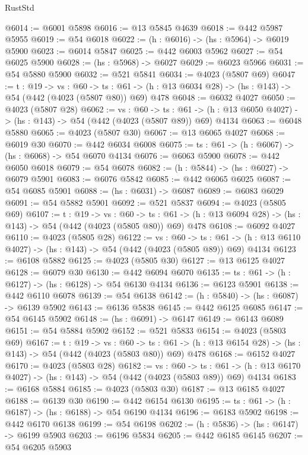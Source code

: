 \begin{lexlean}{RustStd}
\begin{coremodule}
@6014 := @6001 @5898
@6016 := @13 @5845 @4639
@6018 := @442 @5987 @5955
@6019 := @54 @6018
@6022 := (h : @6016) -> (hs : @5964) -> @6019 @5900
@6023 := @6014 @5847
@6025 := @442 @6003 @5962
@6027 := @54 @6025 @5900
@6028 := (hs : @5968) -> @6027
@6029 := @6023 @5966
@6031 := @54 @5880 @5900
@6032 := @521 @5841
@6034 := @4023 (@5807 @69)
@6047 := {t : @19} ->
  {vs : @60} ->
  {ts : @61} -> (h : @13 @6034 @28) -> (hs : @143) -> @54 (@442 (@4023 (@5807 @80)) @69) @478
@6048 := @6032 @4027
@6050 := @4023 (@5807 @28)
@6062 := {vs : @60} ->
  {ts : @61} -> (h : @13 @6050 @4027) -> (hs : @143) -> @54 (@442 (@4023 (@5807 @89)) @69) @4134
@6063 := @6048 @5880
@6065 := @4023 (@5807 @30)
@6067 := @13 @6065 @4027
@6068 := @6019 @30
@6070 := @442 @6034 @6008
@6075 := {ts : @61} -> (h : @6067) -> (hs : @6068) -> @54 @6070 @4134
@6076 := @6063 @5900
@6078 := @442 @6050 @6018
@6079 := @54 @6078
@6082 := (h : @5844) -> (hs : @6027) -> @6079 @5901
@6083 := @6076 @5842
@6085 := @442 @6065 @6025
@6087 := @54 @6085 @5901
@6088 := (hs : @6031) -> @6087
@6089 := @6083 @6029
@6091 := @54 @5882 @5901
@6092 := @521 @5837
@6094 := @4023 (@5805 @69)
@6107 := {t : @19} ->
  {vs : @60} ->
  {ts : @61} -> (h : @13 @6094 @28) -> (hs : @143) -> @54 (@442 (@4023 (@5805 @80)) @69) @478
@6108 := @6092 @4027
@6110 := @4023 (@5805 @28)
@6122 := {vs : @60} ->
  {ts : @61} -> (h : @13 @6110 @4027) -> (hs : @143) -> @54 (@442 (@4023 (@5805 @89)) @69) @4134
@6123 := @6108 @5882
@6125 := @4023 (@5805 @30)
@6127 := @13 @6125 @4027
@6128 := @6079 @30
@6130 := @442 @6094 @6070
@6135 := {ts : @61} -> (h : @6127) -> (hs : @6128) -> @54 @6130 @4134
@6136 := @6123 @5901
@6138 := @442 @6110 @6078
@6139 := @54 @6138
@6142 := (h : @5840) -> (hs : @6087) -> @6139 @5902
@6143 := @6136 @5838
@6145 := @442 @6125 @6085
@6147 := @54 @6145 @5902
@6148 := (hs : @6091) -> @6147
@6149 := @6143 @6089
@6151 := @54 @5884 @5902
@6152 := @521 @5833
@6154 := @4023 (@5803 @69)
@6167 := {t : @19} ->
  {vs : @60} ->
  {ts : @61} -> (h : @13 @6154 @28) -> (hs : @143) -> @54 (@442 (@4023 (@5803 @80)) @69) @478
@6168 := @6152 @4027
@6170 := @4023 (@5803 @28)
@6182 := {vs : @60} ->
  {ts : @61} -> (h : @13 @6170 @4027) -> (hs : @143) -> @54 (@442 (@4023 (@5803 @89)) @69) @4134
@6183 := @6168 @5884
@6185 := @4023 (@5803 @30)
@6187 := @13 @6185 @4027
@6188 := @6139 @30
@6190 := @442 @6154 @6130
@6195 := {ts : @61} -> (h : @6187) -> (hs : @6188) -> @54 @6190 @4134
@6196 := @6183 @5902
@6198 := @442 @6170 @6138
@6199 := @54 @6198
@6202 := (h : @5836) -> (hs : @6147) -> @6199 @5903
@6203 := @6196 @5834
@6205 := @442 @6185 @6145
@6207 := @54 @6205 @5903

\end{coremodule}
\end{lexlean}
